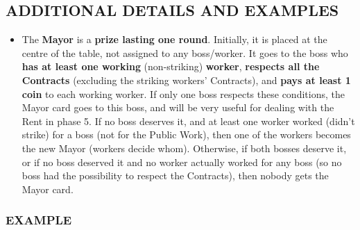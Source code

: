     \subsection{ADDITIONAL DETAILS AND EXAMPLES}

        \begin{itemize}
            \item The \textbf{Mayor} is a \textbf{prize lasting one round}. Initially, it is placed at the centre
            of the table, not assigned to any boss/worker. It goes to the boss who \textbf{has
            at least one working} (non-striking) \textbf{worker}, \textbf{respects all the Contracts} (excluding
            the striking workers' Contracts), and \textbf{pays at least 1 coin} to each
            working worker. If only one boss respects these conditions, the Mayor card
            goes to this boss, and will be very useful for dealing with the Rent in phase
            5. If no boss deserves it, and at least one worker worked (didn't strike) for
            a boss (not for the Public Work), then one of the workers becomes the new
            Mayor (workers decide whom). Otherwise, if both bosses deserve it, or if no
            boss deserved it and no worker actually worked for any boss (so no boss had
            the possibility to respect the Contracts), then nobody gets the Mayor card.
        \end{itemize}
    
        \subsubsection{EXAMPLE}

